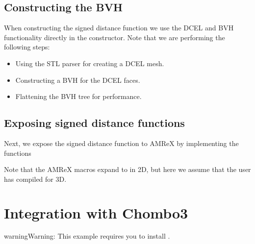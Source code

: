 \documentclass[letterpaper,10pt,english]{sphinxmanual}
\begin{document}
\subsection{Constructing the BVH}
\label{\detokenize{Example_AMReX:constructing-the-bvh}}
\sphinxAtStartPar
When constructing the signed distance function we use the DCEL and BVH functionality directly in the constructor.
Note that we are performing the following steps:
\begin{itemize}
\item {} 
\sphinxAtStartPar
Using the STL parser for creating a DCEL mesh.

\item {} 
\sphinxAtStartPar
Constructing a BVH for the DCEL faces.

\item {} 
\sphinxAtStartPar
Flattening the BVH tree for performance.

\end{itemize}


\subsection{Exposing signed distance functions}
\label{\detokenize{Example_AMReX:exposing-signed-distance-functions}}
\sphinxAtStartPar
Next, we expose the signed distance function to AMReX by implementing the functions

\begin{sphinxVerbatim}[commandchars=\\\{\}]
\end{sphinxVerbatim}

\sphinxAtStartPar
Note that the AMReX  macros expand to  in 2D, but here we assume that the user has compiled for 3D.

\sphinxstepscope


\section{Integration with Chombo3}
\label{\detokenize{Example_Chombo3:integration-with-chombo3}}\label{\detokenize{Example_Chombo3::doc}}
\begin{sphinxadmonition}{warning}{Warning:}
\sphinxAtStartPar
This example requires you to install .
\end{sphinxadmonition}
\end{document}
